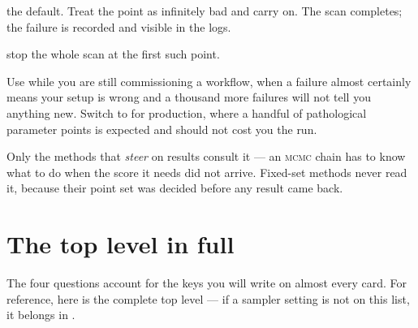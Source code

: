 \begin{keylist}
  \item[reject] the default. Treat the point as infinitely bad and carry on. The scan
        completes; the failure is recorded and visible in the logs.
  \item[halt] stop the whole scan at the first such point.
\end{keylist}

Use  while you are still commissioning a workflow, when a failure almost
certainly means your setup is wrong and a thousand more failures will not tell you
anything new. Switch to  for production, where a handful of pathological
parameter points is expected and should not cost you the run.

Only the methods that \emph{steer} on results consult it --- an \textsc{mcmc} chain has to
know what to do when the score it needs did not arrive. Fixed-set methods never read it,
because their point set was decided before any result came back.

\section{The top level in full}
\label{sec:common-keys}

The four questions account for the keys you will write on almost every card. For
reference, here is the complete top level --- if a sampler setting is not on this list, it
belongs in .

